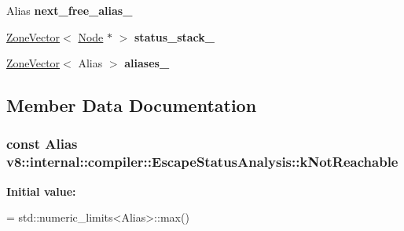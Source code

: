 \begin{DoxyCompactItemize}
\item 
Alias {\bfseries next\+\_\+free\+\_\+alias\+\_\+}\hypertarget{classv8_1_1internal_1_1compiler_1_1_escape_status_analysis_aa6eb62dda443af853c2beb53aa59547f}{}\label{classv8_1_1internal_1_1compiler_1_1_escape_status_analysis_aa6eb62dda443af853c2beb53aa59547f}

\item 
\hyperlink{classv8_1_1internal_1_1_zone_vector}{Zone\+Vector}$<$ \hyperlink{classv8_1_1internal_1_1compiler_1_1_node}{Node} $\ast$ $>$ {\bfseries status\+\_\+stack\+\_\+}\hypertarget{classv8_1_1internal_1_1compiler_1_1_escape_status_analysis_a52a31c4f9d91241caa111ef47c20c58a}{}\label{classv8_1_1internal_1_1compiler_1_1_escape_status_analysis_a52a31c4f9d91241caa111ef47c20c58a}

\item 
\hyperlink{classv8_1_1internal_1_1_zone_vector}{Zone\+Vector}$<$ Alias $>$ {\bfseries aliases\+\_\+}\hypertarget{classv8_1_1internal_1_1compiler_1_1_escape_status_analysis_aa733cb6d40fd11451c7c0d777eea5d28}{}\label{classv8_1_1internal_1_1compiler_1_1_escape_status_analysis_aa733cb6d40fd11451c7c0d777eea5d28}

\end{DoxyCompactItemize}


\subsection{Member Data Documentation}
\subsubsection[{\texorpdfstring{k\+Not\+Reachable}{kNotReachable}}]{\setlength{\rightskip}{0pt plus 5cm}const Alias v8\+::internal\+::compiler\+::\+Escape\+Status\+Analysis\+::k\+Not\+Reachable\hspace{0.3cm}{\ttfamily [static]}}\hypertarget{classv8_1_1internal_1_1compiler_1_1_escape_status_analysis_a43c42d8b899ad99b0658f58f027684cd}{}\label{classv8_1_1internal_1_1compiler_1_1_escape_status_analysis_a43c42d8b899ad99b0658f58f027684cd}
{\bfseries Initial value\+:}
\begin{DoxyCode}
=
    std::numeric\_limits<Alias>::max()
\end{DoxyCode}
